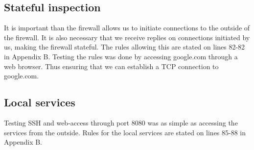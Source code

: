 \subsection{Stateful inspection}
It is important than the firewall allows us to initiate connections to the outside of the firewall. It is also necessary that we receive replies on connections initiated by us, making the firewall stateful. The rules allowing this are stated on lines 82-82 in Appendix B. Testing the rules was done by accessing google.com through a web browser. Thus ensuring that we can establish a TCP connection to google.com.

\subsection{Local services}
Testing SSH and web-access through port 8080 was as simple as accessing the services from the outside. Rules for the local services are stated on lines 85-88 in Appendix B.








